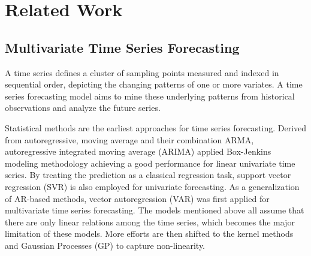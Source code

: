 \documentclass[final,12pt]{elsarticle}
\begin{document}
\section{Related Work}
\label{sec-2}


\subsection{Multivariate Time Series Forecasting}
\label{subsec-2.1}


A time series defines a cluster of sampling points 
measured and indexed in sequential order, 
depicting the changing patterns of one or more variates.  %
A time series forecasting model 
aims to mine these underlying patterns from historical observations 
and analyze the future series.  %


Statistical methods are the earliest approaches for time series forecasting.  %
Derived from autoregressive, moving average 
and their combination ARMA, 
autoregressive integrated moving average (ARIMA) \cite{box1976analysis} 
applied Box-Jenkins modeling methodology 
achieving a good performance for linear univariate time series.  %
By treating the prediction as a classical regression task, 
support vector regression (SVR) \cite{drucker1996support} is also employed 
for univariate forecasting.  %
As a generalization of AR-based methods, 
vector autoregression (VAR) \cite{zivot2006vector} was first applied 
for multivariate time series forecasting.  %
The models mentioned above all assume that 
there are only linear relations among the time series, 
which becomes the major limitation of these models.  %
More efforts are then shifted to the kernel methods \cite{chen2007narx} 
and Gaussian Processes (GP) \cite{frigola2015bayesian} to capture non-linearity.  %
\end{document}
